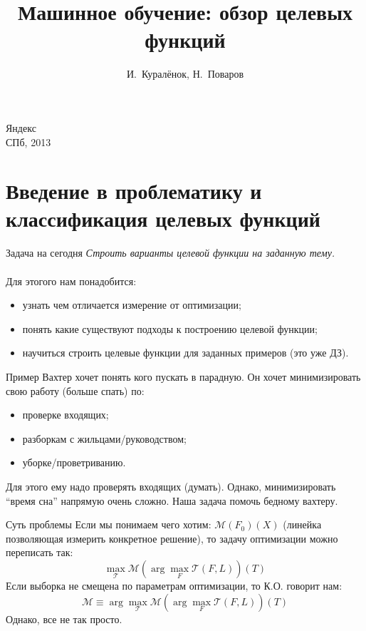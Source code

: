\documentclass[14pt, fleqn, xcolor={dvipsnames, table}]{beamer}
\title{Машинное обучение: обзор целевых функций\\\small{}}
\author[]{\small{%
И.~Куралёнок,
Н.~Поваров}}
\date{}
\begin{document}
\begin{frame}
\maketitle
\small
\begin{center}
\vspace{-60pt}
\normalsize {\color{red}Я}ндекс \\
\vspace{80pt}
\footnotesize СПб, 2013
\end{center}
\end{frame}

\section{Введение в проблематику и классификация целевых функций}
\begin{frame}{Задача на сегодня}
\textit{Строить варианты целевой функции на заданную тему.}\\
~\\
Для этогого нам понадобится:
\begin{itemize}
  \item узнать чем отличается измерение от оптимизации;
  \item понять какие существуют подходы к построению целевой функции;
  \item научиться строить целевые функции для заданных примеров (это уже ДЗ).
\end{itemize}
\end{frame}

\begin{frame}{Пример}
Вахтер хочет понять кого пускать в парадную. Он хочет минимизировать свою работу (больше спать) по:
\begin{itemize}
   \item проверке входящих;
   \item разборкам с жильцами/руководством;
   \item уборке/проветриванию.
\end{itemize}
Для этого ему надо проверять входящих (думать).
Однако, минимизировать ``время сна'' напрямую очень сложно. Наша задача помочь бедному вахтеру.
\end{frame}

\begin{frame}{Суть проблемы}
Если мы понимаем чего хотим: $\mathcal{M}(F_0)(X)$ (линейка позволяющая измерить конкретное решение), то задачу оптимизации можно переписать так:
$$
\max_{\mathcal{T}} \mathcal{M} \left(\arg\max_{F} \mathcal{T}(F, L)\right)(T)
$$
Если выборка не смещена по параметрам оптимизации, то К.О. говорит нам:
$$
\mathcal{M} \equiv \arg \max_{\mathcal{T}} \mathcal{M}\left(\arg\max_{F} \mathcal{T}(F, L)\right)(T)
$$
Однако, все не так просто.
\end{frame}
\end{document}
